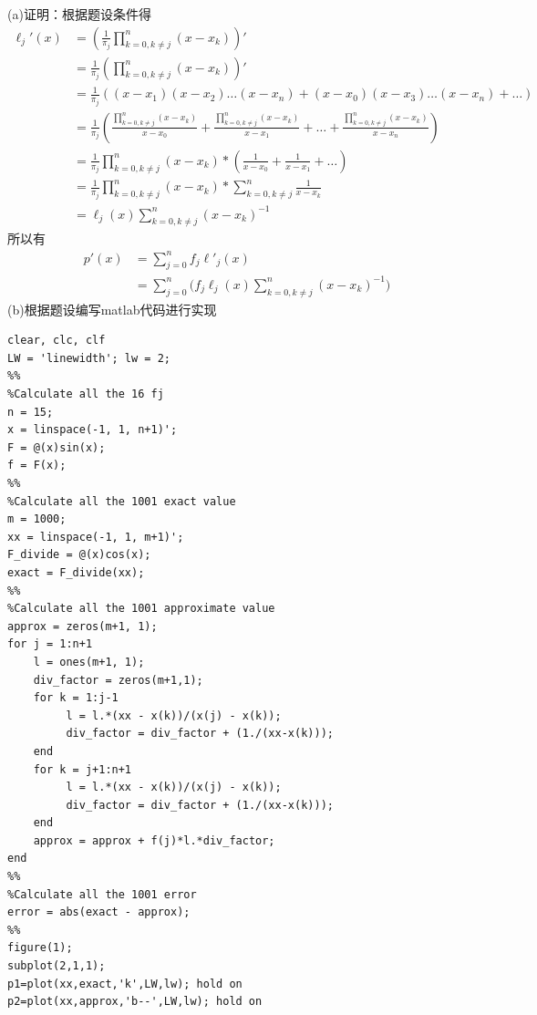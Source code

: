 \documentclass[12pt,a4paper,utf8]{ctexart}
\begin{document}
\begin{enumerate}
(a)证明：根据题设条件得
\begin{equation}
    \begin{aligned}
        \ell_j'(x) &= (\frac{1}{\pi_j} \prod_{k=0,k\neq j}^n (x-x_k))' \\
                    &= \frac{1}{\pi_j} (\prod_{k=0,k\neq j}^n (x-x_k))' \\
                    &= \frac{1}{\pi_j} ( (x-x_1)(x-x_2)\dots (x-x_n) + (x-x_0)(x-x_3)\dots (x-x_n) + \dots ) \\
                    &= \frac{1}{\pi_j} ( \frac{\prod_{k=0,k\neq j}^n (x-x_k)}{x-x_0} + \frac{\prod_{k=0,k\neq j}^n (x-x_k)}{x-x_1} + \dots + \frac{\prod_{k=0,k\neq j}^n (x-x_k)}{x-x_n} ) \\
                    &= \frac{1}{\pi_j} \prod_{k=0,k\neq j}^n (x-x_k) *(\frac{1}{x-x_0} + \frac{1}{x-x_1} + \dots) \\
                    &= \frac{1}{\pi_j} \prod_{k=0,k\neq j}^n (x-x_k) *\sum_{k=0,k\neq j}^n \frac{1}{x-x_k} \\
                    &= \ell_j(x) \sum_{k=0,k\neq j}^n (x-x_k)^{-1}
    \end{aligned}
    \nonumber
\end{equation}
所以有
\begin{equation}
    \begin{aligned}
        p'(x) &= \sum_{j=0}^n f_j\ell'_j(x) \\ 
                &= \sum_{j=0}^n \bigg(f_j\ell_j(x)\sum_{k=0,k\neq j}^n(x-x_k)^{-1}\bigg)
    \end{aligned}
    \nonumber
\end{equation}
(b)根据题设编写matlab代码进行实现
\begin{lstlisting}[frame=single]
clear, clc, clf
LW = 'linewidth'; lw = 2;
%%
%Calculate all the 16 fj
n = 15;
x = linspace(-1, 1, n+1)';
F = @(x)sin(x);
f = F(x);
%%
%Calculate all the 1001 exact value
m = 1000;
xx = linspace(-1, 1, m+1)';
F_divide = @(x)cos(x);
exact = F_divide(xx);
%%
%Calculate all the 1001 approximate value
approx = zeros(m+1, 1);
for j = 1:n+1
    l = ones(m+1, 1);
    div_factor = zeros(m+1,1);
    for k = 1:j-1
         l = l.*(xx - x(k))/(x(j) - x(k));
         div_factor = div_factor + (1./(xx-x(k)));
    end
    for k = j+1:n+1
         l = l.*(xx - x(k))/(x(j) - x(k));
         div_factor = div_factor + (1./(xx-x(k)));
    end
    approx = approx + f(j)*l.*div_factor;
end
%%
%Calculate all the 1001 error
error = abs(exact - approx);
%%
figure(1);
subplot(2,1,1);
p1=plot(xx,exact,'k',LW,lw); hold on
p2=plot(xx,approx,'b--',LW,lw); hold on

\end{lstlisting}
\end{enumerate}
\end{document}
